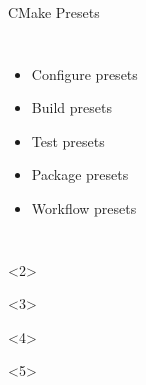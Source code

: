 \documentclass{beamer}
\begin{document}
\begin{frame}[fragile]{CMake Presets}\small%
	\vspace{1cm}
	\begin{columns}
		\begin{itemize}
			\item Configure presets
			\item Build presets
			\item Test presets
			\item Package presets
			\item Workflow presets
		\end{itemize}
	\end{columns}			
	\begin{onlyenv}
		
	\end{onlyenv}
	\begin{onlyenv}
		
	\end{onlyenv}
	\begin{onlyenv}
		
	\end{onlyenv}
	\begin{onlyenv}
		
	\end{onlyenv}

\end{frame}
\end{document}
